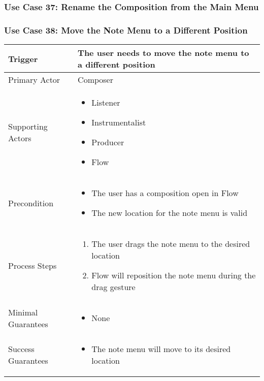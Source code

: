 
\subsubsection{Use Case 37: Rename the Composition from the Main Menu}


\subsubsection{Use Case 38: Move the Note Menu to a Different Position}

\begin{tabularx}{\textwidth}{|X|X|}
\hline
Trigger & 
The user needs to move the note menu to a different position\\
\hline
Primary Actor & 
Composer \\
\hline
Supporting Actors & 
\begin{itemize}
\item Listener
\item Instrumentalist
\item Producer
\item Flow
\end{itemize} \\
\hline
Precondition & 
\begin{itemize}
\item The user has a composition open in Flow
\item The new location for the note menu is valid
\end{itemize} \\
\hline
Process Steps & 
\begin{enumerate}
\item The user drags the note menu to the desired location
\item Flow will reposition the note menu during the drag gesture
\end{enumerate} \\
\hline
Minimal Guarantees & 
\begin{itemize}
  \item None
\end{itemize} \\
\hline
Success Guarantees & 
\begin{itemize}
  \item The note menu will move to its desired location
\end{itemize} \\
\hline
\end{tabularx}

